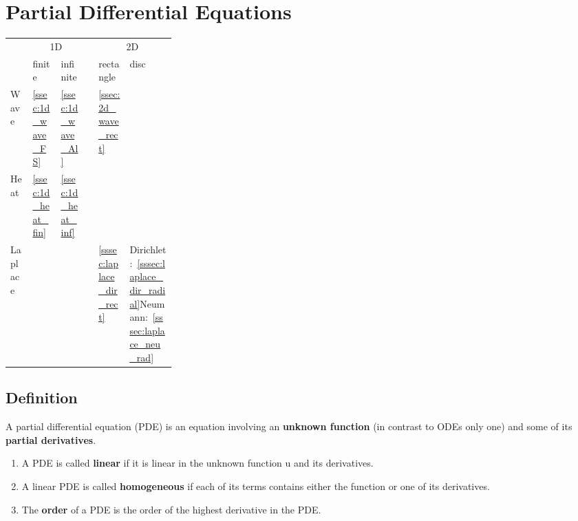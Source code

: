 \section{Partial Differential Equations}

\renewcommand{\arraystretch}{1.3}
\begin{tabularx}{0.98\linewidth}{@{}lllclp{0.28\linewidth}@{}}
    \toprule
            & \multicolumn{2}{c}{1D} & \phantom{.}            & \multicolumn{2}{c}{2D}                                                                                                                         \\ %
    \cmidrule{2-3} \cmidrule{5-6}
            & finite                 & infinite               &                        & rectangle                    & disc                                                                                   \\%
    \cmidrule{1-6}
    Wave    & \ref{ssec:1d_wave_FS}  & \ref{ssec:1d_wave_Al}  &                        & \ref{ssec:2d_wave_rect}                                                                                               \\%
    Heat    & \ref{ssec:1d_heat_fin} & \ref{ssec:1d_heat_inf} &                        &                                                                                                                       \\%
    Laplace &                        &                        &                        & \ref{sssec:laplace_dir_rect} & Dirichlet:~\ref{sssec:laplace_dir_radial}\newline Neumann:~\ref{sssec:laplace_neu_rad} \\%
    \bottomrule
\end{tabularx}
\renewcommand{\arraystretch}{1}


\subsection{Definition}
A partial differential equation (PDE) is an equation involving an \textbf{unknown function} (in contrast to ODEs only one) and some of its \textbf{partial derivatives}.
\begin{enumerate}
    \item A PDE is called \textbf{linear} if it is linear in the unknown function u and its derivatives.
    \item A linear PDE is called \textbf{homogeneous} if each of its terms contains either the function or one of its derivatives.
    \item The \textbf{order} of a PDE is the order of the highest derivative in the PDE.\@
\end{enumerate}


